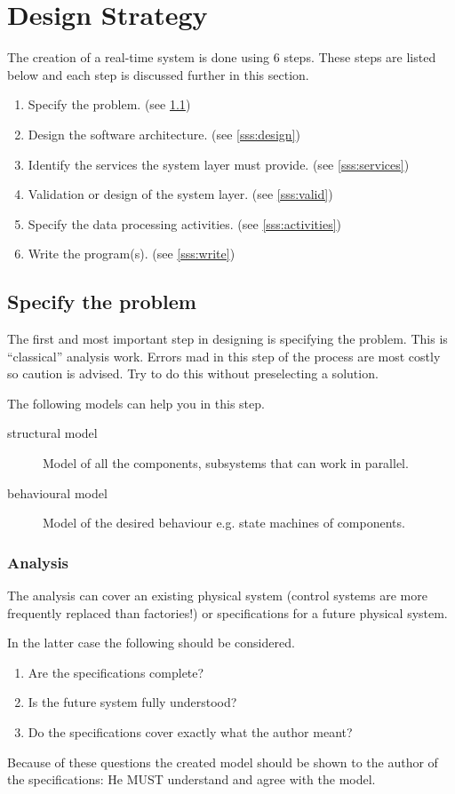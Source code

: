 \documentclass[../main.tex]{subfiles}
\begin{document}
\section{Design Strategy}
The creation of a real-time system is done using 6 steps. These steps are listed below and each step is discussed further in this section. 
\begin{enumerate}
	\item Specify the problem. (see \ref{sss:specify_problem})
	\item Design the software architecture. (see \ref{sss:design})
	\item Identify the services the system layer must provide. (see \ref{sss:services})
	\item Validation or design of the system layer. (see \ref{sss:valid})
	\item Specify the data processing activities. (see \ref{sss:activities})
	\item Write the program(s). (see \ref{sss:write})
\end{enumerate}




\subsection{Specify the problem}
\label{sss:specify_problem}
The first and most important step in designing is specifying the problem. This is ``classical'' analysis work.
Errors mad in this step of the process are most costly so caution is advised. 
Try to do this without preselecting a solution.

The following models can help you in this step.
\begin{description}
	\item[structural model] Model of all the components, subsystems that can work in parallel.
	\item[behavioural model] Model of the desired behaviour e.g. state machines of components. 
\end{description}

\subsubsection{Analysis}
The analysis can cover an existing physical system (control systems are more frequently replaced than factories!) or specifications for a future physical system.

In the latter case the following should be considered.
\begin{enumerate}
	\item Are the specifications complete?
	\item Is the future system fully understood?
	\item Do the specifications cover exactly what the author meant?  
\end{enumerate}
Because of these questions the created model should be shown to the author of the specifications: He MUST understand and agree with the model.
\end{document}
